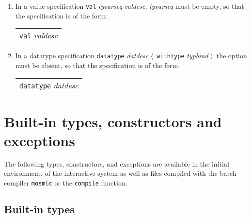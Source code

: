 \documentclass[fleqn,a4paper]{article}
\newcommand{\la}{$\langle$}
\newcommand{\ra}{$\rangle$}
\begin{document}
\begin{itemize}
\begin{enumerate}
  \item\label{valspec} 
  In a value specification {\tt val} {\it tyvarseq\/} {\it valdesc\/},
  {\it tyvarseq\/} must be empty, so that the specification is of the form:

  \begin{tabular}{l}
   {\tt val} {\it valdesc\/}
  \end{tabular}

  \item\label{datatypespec} 
  In a datatype specification 
  {\tt datatype}  {\it datdesc} \la\ {\tt withtype} {\it typbind\/} \ra\
  the option must be absent, so that the specification is of the form:

  \begin{tabular}{l}
  {\tt datatype}  {\it datdesc}
  \end{tabular}
\end{enumerate}
\end{itemize}

\newpage

\section{Built-in types, constructors and exceptions}
\label{sec-builtin}

The following types, constructors, and exceptions are available in the
initial environment, of the interactive system as well as files
compiled with the batch compiler {\tt mosmlc} or the {\tt compile}
function.


\subsection*{Built-in types}
\end{document}
